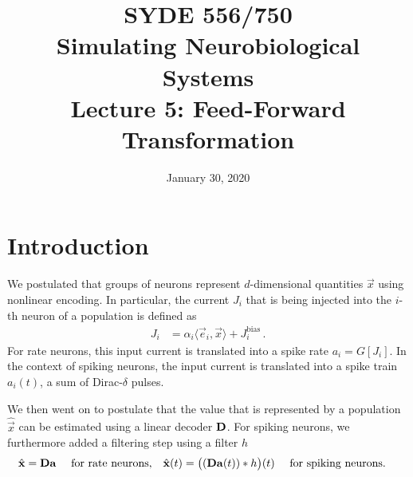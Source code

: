 \documentclass[10pt,letterpaper,oneside]{article}
\date{January 30, 2020}
\title{SYDE 556/750 \\ Simulating Neurobiological Systems \\ Lecture 5: Feed-Forward Transformation}
\begin{document}

\section{Introduction}


We postulated that groups of neurons represent $d$-dimensional quantities $\vec x$ using nonlinear encoding. In particular, the current $J_i$ that is being injected into the $i$-th neuron of a population is defined as
\begin{align*}
	J_i &= \alpha_i \langle \vec e_i, \vec x \rangle + J^\mathrm{bias}_i \,.
\end{align*}
For rate neurons, this input current is translated into a spike rate $a_i = G[J_i]$. In the context of spiking neurons, the input current is translated into a spike train $a_i(t)$, a sum of Dirac-$\delta$ pulses.

We then went on to postulate that the value that is represented by a population $\hat{\vec x}$ can be estimated using a linear decoder ${\mathbf{D}}$. For spiking neurons, we furthermore added a filtering step using a filter $h$
\begin{align*}
	\hat{{\mathbf{x}}} &= {\mathbf{D}} {\mathbf{a}} \quad \text{ for rate neurons,} & 
	\hat{{\mathbf{x}}}(t) &= \big( ({\mathbf{D}} {\mathbf{a}}(t)) \ast h \big)(t) \quad \text{ for spiking neurons.}
\end{align*}
\end{document}
